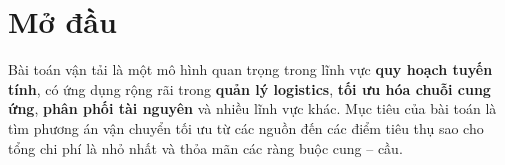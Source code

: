 \documentclass[oneside, a4paper]{book}
\theoremstyle{plain}
\theoremstyle{definition}
\theoremstyle{definition}
\theoremstyle{remark}
\renewcommand{\large}{\fontsize{14pt}{14pt}\selectfont}
\begin{document}
	
\thispagestyle{empty}
\setcounter{page}{1}%





\newpage


%

\newpage




\newpage





\tableofcontents %
\pagestyle{myheadings}

\newpage

\thispagestyle{empty}
\setcounter{page}{1}



\newpage
\listoftables
\thispagestyle{empty}
%

\newpage
\renewcommand{\listfigurename}{Danh sách hình ảnh}
\listoffigures


{}

\clearpage

\chapter*{Mở đầu}
Bài toán vận tải là một mô hình quan trọng trong lĩnh vực \textbf{quy hoạch tuyến tính}, có ứng dụng rộng rãi trong \textbf{quản lý logistics}, \textbf{tối ưu hóa chuỗi cung ứng}, \textbf{phân phối tài nguyên} và nhiều lĩnh vực khác. Mục tiêu của bài toán là tìm phương án vận chuyển tối ưu từ các nguồn đến các điểm tiêu thụ sao cho tổng chi phí là nhỏ nhất và thỏa mãn các ràng buộc cung – cầu.
\end{document}

